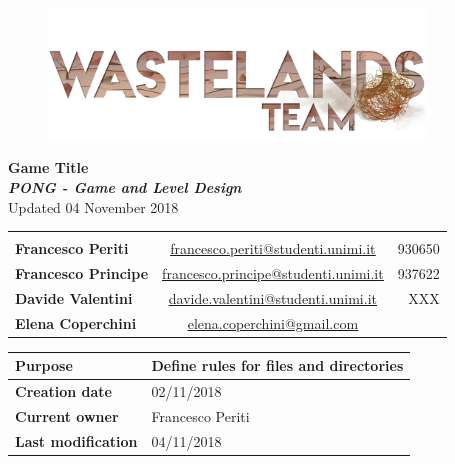 \documentclass[12pt]{article}
\begin{document}
\begin{center}
  \begin{figure}[H]
    \centering
  \vspace*{5\baselineskip}
  \includegraphics[width=10cm]{Documents/Images/logoTeam}
  \end{figure}

  {\huge \textbf{Game Title}} \\
  {\large \textbf{ \textit{PONG - Game and Level Design}}} \\
  Updated 04 November 2018 \\

  \begin{tabular}{lcr}\\\\
    \textbf{Francesco Periti}	& \underline{\href{mailto:francesco.periti@studenti.unimi.it}{francesco.periti@studenti.unimi.it}}	& 930650 \\
    \textbf{Francesco Principe}	& \underline{\href{mailto:francesco.principe@studenti.unimi.it}{francesco.principe@studenti.unimi.it}}	& 937622 \\
    \textbf{Davide Valentini}	& \underline{\href{mailto:davide.valentini@studenti.unimi.it}{davide.valentini@studenti.unimi.it}}	& XXX \\
    \textbf{Elena Coperchini}	& \underline{\href{mailto:elena.coperchini@gmail.com}{elena.coperchini@gmail.com}}			& \\
  \end{tabular}


\begin{table}[H]
  \begin{tabular}{|l|l|}
    \hline
    \cellcolor{lightgray}\textbf{Purpose} &  Define rules for files and directories \\\hline
    \cellcolor{lightgray}\textbf{Creation date} & 02/11/2018 \\\hline
    \cellcolor{lightgray}\textbf{Current owner} & Francesco Periti \\\hline
    \cellcolor{lightgray}\textbf{Last modification} & 04/11/2018 \\\hline
  \end{tabular}
\end{table}
\end{center}
\end{document}
